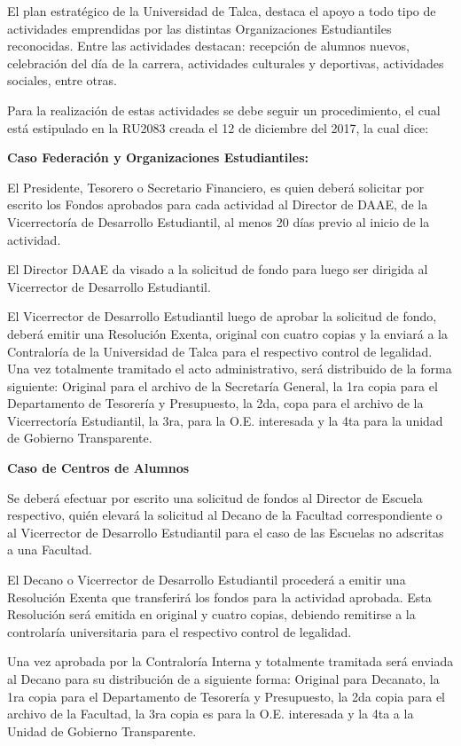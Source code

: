 El plan estratégico de la Universidad de Talca, destaca el apoyo a todo tipo de actividades emprendidas por las distintas Organizaciones Estudiantiles reconocidas. Entre las actividades destacan: recepción de alumnos nuevos, celebración del día de la carrera, actividades culturales y deportivas, actividades sociales, entre otras. \cite{5}

Para la realización de estas actividades se debe seguir un procedimiento, el cual está estipulado en la RU2083 creada el 12 de diciembre del 2017, la cual dice:

\begin{tasks}[counter-format = {tsk[A].}]
	\task \textbf{Caso Federación y Organizaciones Estudiantiles:}

	El Presidente, Tesorero o Secretario Financiero, es quien deberá solicitar por escrito los Fondos aprobados para cada actividad al Director de DAAE, de la Vicerrectoría de Desarrollo Estudiantil, al menos 20 días previo al inicio de la actividad.

	El Director DAAE da visado a la solicitud de fondo para luego ser dirigida al Vicerrector de Desarrollo Estudiantil.

	El Vicerrector de Desarrollo Estudiantil luego de aprobar la solicitud de fondo, deberá emitir una Resolución Exenta, original con cuatro copias y la enviará a la Contraloría de la Universidad de Talca para el respectivo control de legalidad. Una vez totalmente tramitado el acto administrativo, será distribuido de la forma siguiente: Original para el archivo de la Secretaría General, la 1ra copia  para el Departamento de Tesorería y Presupuesto, la 2da, copa para el archivo de la Vicerrectoría Estudiantil, la 3ra, para la O.E. interesada y la 4ta para la unidad de Gobierno Transparente.

	\task \textbf{Caso de Centros de Alumnos}

	Se deberá efectuar por escrito una solicitud de fondos al Director de Escuela respectivo, quién elevará la solicitud al Decano de la Facultad correspondiente o al Vicerrector de Desarrollo Estudiantil para el caso de las Escuelas no adscritas a una Facultad.

	El Decano o Vicerrector de Desarrollo Estudiantil procederá a emitir una Resolución Exenta que transferirá los fondos para la actividad aprobada. Esta Resolución será emitida en original y cuatro copias, debiendo remitirse a la controlaría universitaria para el respectivo control de legalidad.

	Una vez aprobada por la Contraloría Interna y totalmente tramitada será enviada al Decano para su distribución de a siguiente forma: Original para Decanato, la 1ra copia para el Departamento de Tesorería y Presupuesto, la 2da copia para el archivo de la Facultad, la 3ra copia es para la O.E. interesada y la 4ta a la Unidad de Gobierno Transparente.

\end{tasks}

